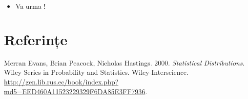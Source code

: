 \documentclass[]{article}
\newenvironment{frshaded*}{%
  \def\FrameCommand{\fboxrule=\FrameRule\fboxsep=\FrameSep \fcolorbox{framecolor}{shadecolor1}}%
  \MakeFramed {\advance\hsize-\width \FrameRestore}}%
{\endMakeFramed}
\newenvironment{rmdblock}[1]
  {\begin{frshaded*}
  \begin{itemize}
  \renewcommand{\labelitemi}{
    \raisebox{-.7\height}[0pt][0pt]{
      {\setkeys{Gin}{width=2em,keepaspectratio}\texttt{[image: images/icons/\#1]}}
    }
  }
  \item
  }
  {
  \end{itemize}
  \end{frshaded*}
  }
\newenvironment{rmdexercise}
  {\begin{rmdblock}{exercise}}
  {\end{rmdblock}}
\begin{document}
\begin{rmdexercise}
Va urma !
\end{rmdexercise}

\section*{Referințe}\label{referinte}

\hypertarget{refs}{}
\hypertarget{ref-Evans2000}{}
Merran Evans, Brian Peacock, Nicholas Hastings. 2000. \emph{Statistical
Distributions}. Wiley Series in Probability and Statistics.
Wiley-Interscience.
\url{http://gen.lib.rus.ec/book/index.php?md5=EED460A11523229329F6DA85E3FF7936}.
\end{document}
